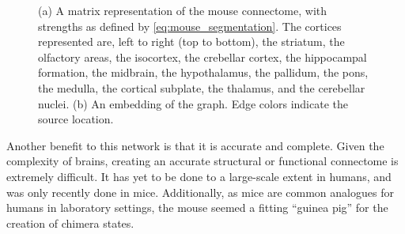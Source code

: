 \begin{figure}[ht]
  \centering
   \hfill
  \caption[Mouse connectome]{(a) A matrix representation of the mouse connectome, with strengths as defined by \cref{eq:mouse_segmentation}.
    The cortices represented are, left to right (top to bottom),
    the striatum,
    the olfactory areas,
    the isocortex,
    the crebellar cortex,
    the hippocampal formation,
    the midbrain,
    the hypothalamus,
    the pallidum,
    the pons,
    the medulla,
    the cortical subplate,
    the thalamus,
    and the cerebellar nuclei.
    (b) An embedding of the graph.
    Edge colors indicate the source location.
  }
  \label{fig:mouse_connectome}
\end{figure}

Another benefit to this network is that it is accurate and complete.
Given the complexity of brains, creating an accurate structural or functional connectome is extremely difficult.
It has yet to be done to a large-scale extent in humans, and was only recently done in mice.
Additionally, as mice are common analogues for humans in laboratory settings, the mouse seemed a fitting ``guinea pig'' for the creation of chimera states.

